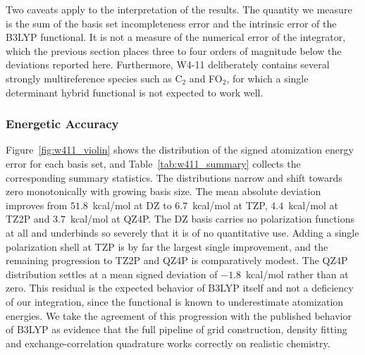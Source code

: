 \documentclass{article}
\begin{document}

Two caveats apply to the interpretation of the results. The quantity we
measure is the sum of the basis set incompleteness error and the
intrinsic error of the B3LYP functional. It is not a measure of the
numerical error of the integrator, which the previous section places
three to four orders of magnitude below the deviations reported here.
Furthermore, W4-11 deliberately contains several strongly
multireference species such as C$_2$ and FO$_2$, for which a single
determinant hybrid functional is not expected to work well.

\subsubsection{Energetic Accuracy}

Figure~\ref{fig:w411_violin} shows the distribution of the signed
atomization energy error for each basis set, and
Table~\ref{tab:w411_summary} collects the corresponding summary
statistics. The distributions narrow and shift towards zero
monotonically with growing basis size. The mean absolute deviation
improves from $51.8$~kcal/mol at DZ to $6.7$~kcal/mol at TZP,
$4.4$~kcal/mol at TZ2P and
$3.7$~kcal/mol at QZ4P. The DZ basis carries no polarization
functions at all
and underbinds so severely that it is of no quantitative use. Adding a
single polarization shell at TZP is by far the largest single
improvement, and the remaining progression to TZ2P and QZ4P is
comparatively modest. The QZ4P distribution settles at a mean signed
deviation of $-1.8$~kcal/mol rather than at zero. This residual is the
expected behavior of B3LYP itself and not a deficiency of our
integration, since the functional is known to underestimate atomization
energies.\cite{Bauschlicher1995} We take the agreement of this
progression with the published
behavior of B3LYP as evidence that the full pipeline of grid
construction, density fitting and exchange-correlation quadrature works
correctly on realistic chemistry.
\end{document}
